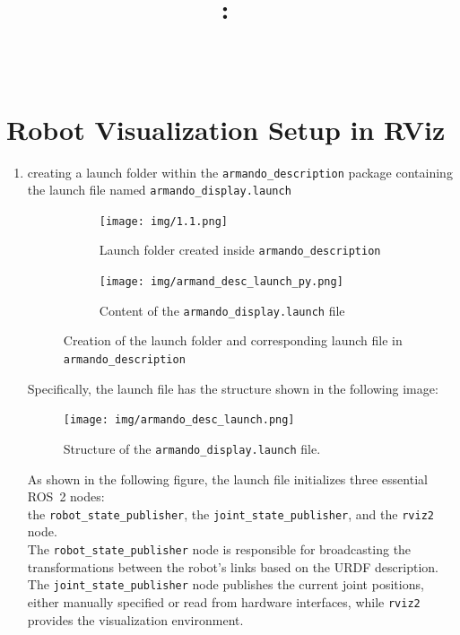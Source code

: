\documentclass{article}
\title{
	\vspace{2in}
	\textmd{\textbf{\hmwkClass:\ \hmwkTitle}}\\
	\normalsize\vspace{0.1in}\small{\hmwkSubtitle}\\
	\vspace{3in}
}
\author{\hmwkAuthorName}
\date{}
\begin{document}
\maketitle
\pagebreak

\section{Robot Visualization Setup in RViz}
\begin{enumerate}
	\item creating a launch folder within the \lstinline{armando_description} package containing the launch file named \lstinline{armando_display.launch}
    \begin{figure}[h]
    \centering
    \begin{subfigure}[t]{0.48\linewidth}
        \centering
        \texttt{[image: img/1.1.png]}
        \caption{Launch folder created inside \texttt{armando\_description}}
        \label{fig:1.1}
    \end{subfigure}
    \hfill
    \begin{subfigure}[t]{0.48\linewidth}
        \centering
        \texttt{[image: img/armand\_desc\_launch\_py.png]}
        \caption{Content of the \texttt{armando\_display.launch} file}
        \label{fig:armand_desc_launch_py}
    \end{subfigure}
    \caption{Creation of the launch folder and corresponding launch file in \texttt{armando\_description}}
    \label{fig:launch_setup}
    \end{figure}
    
\noindent Specifically, the launch file has the structure shown in the following image:

\begin{figure}[h]
    \centering
    \texttt{[image: img/armando\_desc\_launch.png]}
    \caption{Structure of the \texttt{armando\_display.launch} file.}
    \label{fig:armando_desc_launch}
\end{figure}

\clearpage
\noindent As shown in the following figure, the launch file initializes three essential ROS~2 nodes: \\
the \lstinline{robot_state_publisher}, the \lstinline{joint_state_publisher}, and the \lstinline{rviz2} node. \\ 
The \lstinline{robot_state_publisher} node is responsible for broadcasting the transformations between the robot’s links 
based on the URDF description. The \lstinline{joint_state_publisher} node publishes the current joint positions, 
either manually specified or read from hardware interfaces, while \lstinline{rviz2} provides the visualization environment.


\end{enumerate}
\end{document}
